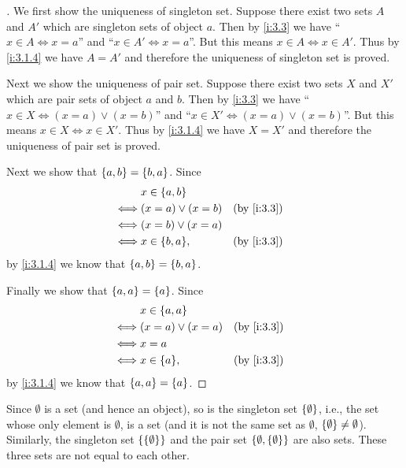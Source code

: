 \begin{proof}[]
  We first show the uniqueness of singleton set.
  Suppose there exist two sets \(A\) and \(A'\) which are singleton sets of object \(a\).
  Then by \cref{i:3.3} we have ``\(x \in A \iff x = a\)'' and ``\(x \in A' \iff x = a\)''.
  But this means \(x \in A \iff x \in A'\).
  Thus by \cref{i:3.1.4} we have \(A = A'\) and therefore the uniqueness of singleton set is proved.

  Next we show the uniqueness of pair set.
  Suppose there exist two sets \(X\) and \(X'\) which are pair sets of object \(a\) and \(b\).
  Then by \cref{i:3.3} we have ``\(x \in X \iff (x = a) \lor (x = b)\)'' and ``\(x \in X' \iff (x = a) \lor (x = b)\)''.
  But this means \(x \in X \iff x \in X'\).
  Thus by \cref{i:3.1.4} we have \(X = X'\) and therefore the uniqueness of pair set is proved.

  Next we show that \(\left\lbrace a, b\right\rbrace = \left\lbrace b, a\right\rbrace\).
  Since
  \begin{align*}
         & x \in \set{a, b}                     \\
    \iff & (x = a) \lor (x = b) &  & \by{i:3.3} \\
    \iff & (x = b) \lor (x = a)                 \\
    \iff & x \in \set{b, a},    &  & \by{i:3.3}
  \end{align*}
  by \cref{i:3.1.4} we know that \(\left\lbrace a, b\right\rbrace = \left\lbrace b, a\right\rbrace\).

  Finally we show that \(\left\lbrace a, a\right\rbrace = \left\lbrace a\right\rbrace\).
  Since
  \begin{align*}
         & x \in \set{a, a}                     \\
    \iff & (x = a) \lor (x = a) &  & \by{i:3.3} \\
    \iff & x = a                                \\
    \iff & x \in \set{a},       &  & \by{i:3.3}
  \end{align*}
  by \cref{i:3.1.4} we know that \(\left\lbrace a, a\right\rbrace = \left\lbrace a\right\rbrace\).
\end{proof}

\begin{eg}\label{i:3.1.10}
  Since \(\emptyset\) is a set (and hence an object), so is the singleton set \(\left\lbrace\emptyset\right\rbrace\), i.e., the set whose only element is \(\emptyset\), is a set (and it is not the same set as \(\emptyset\), \(\left\lbrace\emptyset\right\rbrace \neq \emptyset\)).
  Similarly, the singleton set \(\left\lbrace\left\lbrace\emptyset\right\rbrace\right\rbrace\) and the pair set \(\left\lbrace\emptyset, \left\lbrace\emptyset\right\rbrace\right\rbrace\) are also sets.
  These three sets are not equal to each other.
\end{eg}

